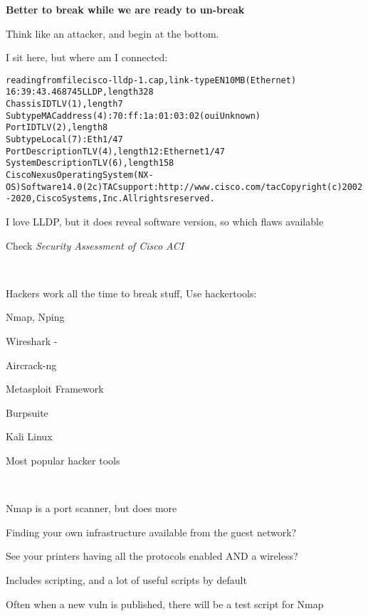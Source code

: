 \documentclass[Screen16to9,17pt]{foils}
\begin{document}
\centerline{\bf Better to break while we are ready to un-break}



Think like an attacker, and begin at the bottom.

I sit here, but where am I connected:
\begin{alltt}\footnotesize
reading from file cisco-lldp-1.cap, link-type EN10MB (Ethernet)
16:39:43.468745 LLDP, length 328
        Chassis ID TLV (1), length 7
          Subtype MAC address (4): 70:ff:1a:01:03:02 (oui Unknown)
        Port ID TLV (2), length 8
          Subtype Local (7): Eth1/47
        Port Description TLV (4), length 12: Ethernet1/47
        System Description TLV (6), length 158
          Cisco Nexus Operating System (NX-OS) Software 14.0(2c) TAC support: http://www.cisco.com/tac Copyright (c) 2002-2020, Cisco Systems, Inc. All rights reserved.
\end{alltt}

\vskip 5mm
\centerline{I love LLDP, but it does reveal software version, so which flaws available}

Check \emph{Security Assessment of Cisco ACI}\\

{~}

\begin{list2}
\item Hackers work all the time to break stuff, Use hackertools:
\item Nmap, Nping 
\item Wireshark - 
\item Aircrack-ng 
\item Metasploit Framework 
\item Burpsuite 
\item Kali Linux 
\end{list2}

\centerline{Most popular hacker tools }



{~}

\begin{list2}
\item Nmap is a port scanner, but does more
\item Finding your own infrastructure available from the guest network?
\item See your printers having all the protocols enabled AND a wireless?
\item Includes scripting, and a lot of useful scripts by default
\item Often when a new vuln is published, there will be a test script for Nmap
\end{list2}
\end{document}
